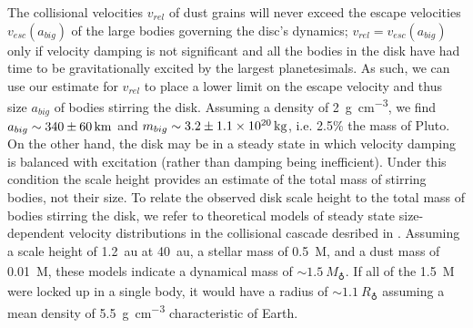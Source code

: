 \documentclass[modern]{aastex62}
\begin{document}
The collisional velocities $v_{rel}$ of dust grains will never exceed the escape velocities $v_{esc}(a_{big})$ of the large bodies governing the disc's dynamics; $v_{rel} = v_{esc}(a_{big})$ only if velocity damping is not significant and all the bodies in the disk have had time to be gravitationally excited by the largest planetesimals. 
As such, we can use our estimate for $v_{rel}$ to place a lower limit on the escape velocity and thus size $a_{big}$ of bodies stirring the disk.
Assuming a density of \SI{2}{\g.\cm^{-3}}, we find $a_{big} \sim \SI{340 \pm 60}{km}$ and $m_{big} \sim \SI{3.2 \pm 1.1e20}{kg}$, i.e. 2.5\% the mass of Pluto.
On the other hand, the disk may be in a steady state in which velocity damping is balanced with excitation (rather than damping being inefficient).
Under this condition the scale height provides an estimate of the total mass of stirring bodies, not their size.
To relate the observed disk scale height to the total mass of bodies stirring the disk, we refer to theoretical models of steady state size-dependent velocity distributions in the collisional cascade desribed in \cite{pan&schlichting12}.
Assuming a scale height of \SI{1.2}{au} at \SI{40}{au}, a stellar mass of \SI{0.5}{M_\sun}, and a dust mass of \SI{0.01}{M_\earth}, these models indicate a dynamical mass of $\sim\SI{1.5}{M_\earth}$.
If all of the \SI{1.5}{M_\earth} were locked up in a single body, it would have a radius of $\sim \SI{1.1}{R_\earth}$ assuming a mean density of \SI{5.5}{\g.\cm^{-3}} characteristic of Earth.
\end{document}
